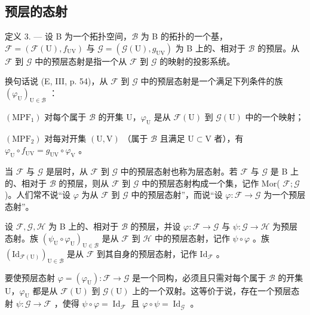 \subsection{预层的态射}

定义 3. --- 设 B 为一个拓扑空间，\(\mathcal{B}\) 为 B 的拓扑的一个基，\(\mathcal{F} = (\mathcal{F}(\mathrm{U}), f_{\mathrm{UV}})\) 与 \(\mathcal{G} = (\mathcal{G}(\mathrm{U}), g_{\mathrm{UV}})\) 为 B 上的、相对于 \(\mathcal{B}\) 的预层。从 \(\mathcal{F}\) 到 \(\mathcal{G}\) 中的预层态射是指一个从 \(\mathcal{F}\) 到 \(\mathcal{G}\) 的映射的投影系统。

换句话说 (E, III, p. 54)，从 \(\mathcal{F}\) 到 \(\mathcal{G}\) 中的预层态射是一个满足下列条件的族 \((\varphi_{\mathrm{U}})_{\mathrm{U}\in \mathcal{B}}\) ：

\((\mathrm{MPF}_1)\) 对每个属于 \(\mathcal{B}\) 的开集 U，\(\varphi_{\mathrm{U}}\) 是从 \(\mathcal{F}(\mathrm{U})\) 到 \(\mathcal{G}(\mathrm{U})\) 中的一个映射；

\((\mathrm{MPF}_2)\) 对每对开集 \((\mathrm{U},\mathrm{V})\) （属于 \(\mathcal{B}\) 且满足 \(\mathrm{U}\subset \mathrm{V}\) 者），有 \(\varphi_{\mathrm{U}}\circ f_{\mathrm{UV}} = g_{\mathrm{UV}}\circ \varphi_{\mathrm{V}}\) 。

当 \(\mathcal{F}\) 与 \(\mathcal{G}\) 是层时，从 \(\mathcal{F}\) 到 \(\mathcal{G}\) 中的预层态射也称为层态射。若 \(\mathcal{F}\) 与 \(\mathcal{G}\) 是 B 上的、相对于 \(\mathcal{B}\) 的预层，则从 \(\mathcal{F}\) 到 \(\mathcal{G}\) 中的预层态射构成一个集，记作 Mor( \(\mathcal{F};\mathcal{G}\) )。人们常不说“设 \(\varphi\) 为从 \(\mathcal{F}\) 到 \(\mathcal{G}\) 中的预层态射”，而说“设 \(\varphi\colon\mathcal{F}\to\mathcal{G}\) 为一个预层态射”。

设 \(\mathcal{F},\mathcal{G},\mathcal{H}\) 为 B 上的、相对于 \(\mathcal{B}\) 的预层，并设 \(\varphi \colon \mathcal{F}\to \mathcal{G}\) 与 \(\psi \colon \mathcal{G}\to \mathcal{H}\) 为预层态射。族 \((\psi_{\mathrm{U}}\circ \varphi_{\mathrm{U}})_{\mathrm{U}\in \mathcal{B}}\) 是从 \(\mathcal{F}\) 到 \(\mathcal{H}\) 中的预层态射，记作 \(\psi \circ \varphi\) 。族 \((\mathrm{Id}_{\mathcal{F}(\mathrm{U})})_{\mathrm{U}\in \mathcal{B}}\) 是从 \(\mathcal{F}\) 到其自身的预层态射，记作 \(\mathrm{Id}_{\mathcal{F}}\) 。

要使预层态射 \(\varphi = (\varphi_{\mathrm{U}})\colon \mathcal{F}\to \mathcal{G}\) 是一个同构，必须且只需对每个属于 \(\mathcal{B}\) 的开集 U，\(\varphi_{\mathrm{U}}\) 都是从 \(\mathcal{F}(\mathrm{U})\) 到 \(\mathcal{G}(\mathrm{U})\) 上的一个双射。这等价于说，存在一个预层态射 \(\psi \colon \mathcal{G}\to \mathcal{F}\) ，使得 \(\psi \circ \varphi = \operatorname{Id}_{\mathcal{F}}\) 且 \(\varphi \circ \psi = \operatorname{Id}_{\mathcal{G}}\) 。

